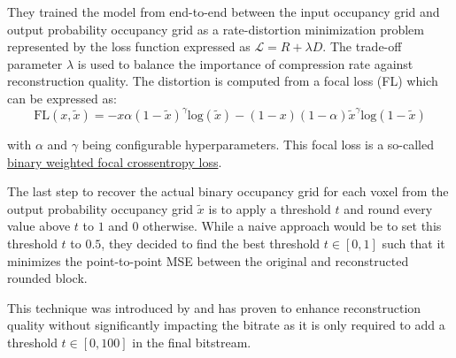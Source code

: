 They trained the model from end-to-end between the input occupancy grid and output probability occupancy grid as a rate-distortion minimization problem represented by the loss function expressed as $\mathcal{L} = R + \lambda D$. The trade-off parameter $\lambda$ is used to balance the importance of compression rate against reconstruction quality. 
The distortion is computed from a focal loss (FL) which can be expressed as: 
$$
\text{FL}(x, \tilde{x}) = -x \alpha (1-\tilde{x})^{\gamma} \text{log}(\tilde{x}) - (1-x) (1-\alpha) \tilde{x}^{\gamma} \text{log}(1-\tilde{x})
$$

\noindent with $\alpha$ and $\gamma$ being configurable hyperparameters. This focal loss is a so-called \href{https://www.tensorflow.org/api_docs/python/tf/keras/losses/BinaryFocalCrossentropy}{binary weighted focal crossentropy loss}.

The last step to recover the actual binary occupancy grid for each voxel from the output probability occupancy grid $\tilde{x}$ is to apply a threshold $t$ and round every value above $t$ to $1$ and $0$ otherwise. While a naive approach would be to set this threshold $t$ to $0.5$, they decided to find the best threshold $t \in [0,1]$ such that it minimizes the point-to-point MSE \cite{bib:8296925} between the original and reconstructed rounded block.

This technique was introduced by \cite{bib:9287077} and has proven to enhance reconstruction quality without significantly impacting the bitrate as it is only required to add a threshold $t \in [0,100]$ in the final bitstream.

